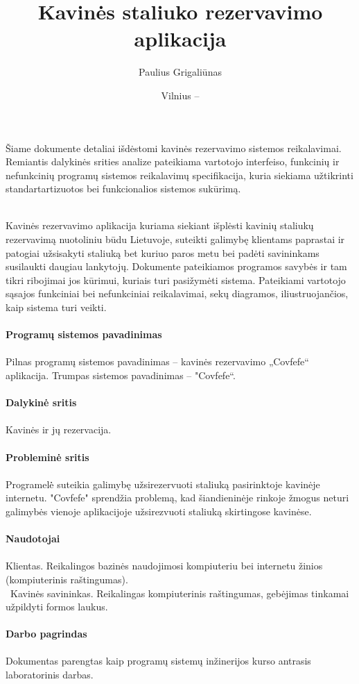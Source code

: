 \documentclass{VUMIFPSkursinis}
\title{Kavinės staliuko rezervavimo aplikacija}
\author{Paulius Grigaliūnas}
\date{Vilnius – \the\year}
\begin{document}
\maketitle
\cleardoublepage{}
\setcounter{page}{2}



\noindent
Šiame dokumente detaliai išdėstomi kavinės rezervavimo sistemos reikalavimai. Remiantis dalykinės srities analize pateikiama vartotojo interfeiso, funkcinių ir nefunkcinių programų sistemos reikalavimų specifikacija, kuria siekiama užtikrinti standartartizuotos bei funkcionalios sistemos sukūrimą.\\\\




\tableofcontents

\noindent
Kavinės rezervavimo aplikacija kuriama siekiant išplėsti kavinių staliukų rezervavimą nuotoliniu būdu Lietuvoje, suteikti galimybę klientams paprastai ir patogiai užsisakyti staliuką bet kuriuo paros metu bei padėti savininkams susilaukti daugiau lankytojų. 
\newline
Dokumente pateikiamos programos savybės ir tam tikri ribojimai jos kūrimui, kuriais turi pasižymėti sistema. Pateikiami vartotojo sąsajos funkciniai bei nefunkciniai reikalavimai, sekų diagramos, iliustruojančios, kaip sistema turi veikti.\\\\
{\bfseries Programų sistemos pavadinimas}\\\\
Pilnas programų sistemos pavadinimas – kavinės rezervavimo „Covfefe“ aplikacija. Trumpas sistemos pavadinimas – "Covfefe“.\\\\
{\bfseries Dalykinė sritis}\\\\
Kavinės ir jų rezervacija.\\\\
\noindent
{\bfseries Probleminė sritis}\\\\
Programelė̇ suteikia galimybę užsirezervuoti staliuką pasirinktoje kavinėje internetu. "Covfefe" sprendžia problemą, kad šiandieninėje rinkoje žmogus neturi galimybės vienoje aplikacijoje užsirezvuoti staliuką skirtingose kavinėse.\\\\
{\bfseries Naudotojai}\\\\
Klientas. Reikalingos bazinės naudojimosi kompiuteriu bei internetu žinios (kompiuterinis raštingumas).\\\
Kavinės savininkas. Reikalingas kompiuterinis raštingumas, gebėjimas tinkamai užpildyti formos laukus.\\\\
{\bfseries Darbo pagrindas}\\\\
Dokumentas parengtas kaip programų sistemų inžinerijos kurso antrasis laboratorinis darbas.
\newline
\end{document}
